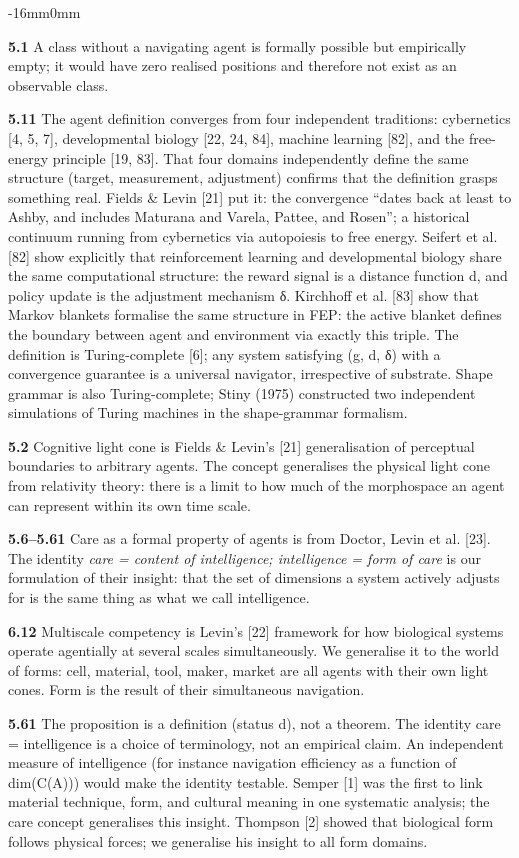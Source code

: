 \documentclass[10pt,oneside]{book}
\newcommand{\msym}[1]{{\mathfbfont #1}}
\newenvironment{widebody}{%
  \begin{adjustwidth}{-16mm}{0mm}%
}{%
  \end{adjustwidth}%
}
\begin{document}
\begin{widebody}
{\textbf{5.1} A class without a navigating agent is formally possible but empirically empty; it would have zero realised positions and therefore not exist as an observable class.

\textbf{5.11} The agent definition converges from four independent traditions: cybernetics [4, 5, 7], developmental biology [22, 24, 84], machine learning [82], and the free-energy principle [19, 83]. That four domains independently define the same structure (target, measurement, adjustment) confirms that the definition grasps something real. Fields \& Levin [21] put it: the convergence ``dates back at least to Ashby, and includes Maturana and Varela, Pattee, and Rosen''; a historical continuum running from cybernetics via autopoiesis to free energy. Seifert et al. [82] show explicitly that reinforcement learning and developmental biology share the same computational structure: the reward signal is a distance function d, and policy update is the adjustment mechanism δ. Kirchhoff et al. [83] show that Markov blankets formalise the same structure in FEP: the active blanket defines the boundary between agent and environment via exactly this triple. The definition is Turing-complete [6]; any system satisfying (g, d, \msym{δ}) with a convergence guarantee is a universal navigator, irrespective of substrate. Shape grammar is also Turing-complete; Stiny (1975) constructed two independent simulations of Turing machines in the shape-grammar formalism.

\textbf{5.2} Cognitive light cone is Fields \& Levin's [21] generalisation of perceptual boundaries to arbitrary agents. The concept generalises the physical light cone from relativity theory: there is a limit to how much of the morphospace an agent can represent within its own time scale.

\textbf{5.6--5.61} Care as a formal property of agents is from Doctor, Levin et al. [23]. The identity \textit{care = content of intelligence; intelligence = form of care} is our formulation of their insight: that the set of dimensions a system actively adjusts for is the same thing as what we call intelligence.

\textbf{6.12} Multiscale competency is Levin's [22] framework for how biological systems operate agentially at several scales simultaneously. We generalise it to the world of forms: cell, material, tool, maker, market are all agents with their own light cones. Form is the result of their simultaneous navigation.

\textbf{5.61} The proposition is a definition (status d), not a theorem. The identity care = intelligence is a choice of terminology, not an empirical claim. An independent measure of intelligence (for instance navigation efficiency as a function of dim(C(A))) would make the identity testable. Semper [1] was the first to link material technique, form, and cultural meaning in one systematic analysis; the care concept generalises this insight. Thompson [2] showed that biological form follows physical forces; we generalise his insight to all form domains.

}
\end{widebody}
\end{document}
